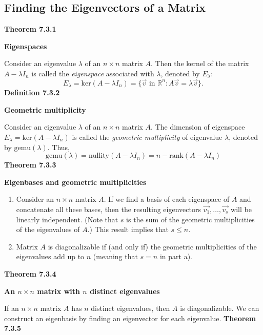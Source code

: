 \subsection{Finding the Eigenvectors of a Matrix}
\textbf{Theorem 7.3.1}\\
\par\noindent\textbf{Eigenspaces}
\par\noindent Consider an eigenvalue $\lambda{}$ of an $n\times{}n$ matrix $A$. Then the kernel of the matrix $A-\lambda{}I_{n}$ is called the \textit{eigenspace} associated with $\lambda{}$, denoted by $E_{\lambda{}}$:
\[E_\lambda{}=\textrm{ker}(A-\lambda{}I_{n})=\{\vec{v}\textrm{ in }\mathbb{R}^{n}:A\vec{v}=\lambda{}\vec{v}\}.\]
\textbf{Definition 7.3.2}\\
\par\noindent\textbf{Geometric multiplicity}
\par\noindent Consider an eigenvalue $\lambda{}$ of an $n\times{}n$ matrix $A$. The dimension of eigenspace $E_{\lambda{}}=\textrm{ker}(A-\lambda{}I_{n})$ is called the \textit{geometric multiplicity} of eigenvalue $\lambda{}$, denoted by $\textrm{gemu}(\lambda{})$. Thus,
\[\textrm{gemu}(\lambda{})=\textrm{nullity}(A-\lambda{}I_{n})=n-\textrm{rank}(A-\lambda{}I_{n})\]
\textbf{Theorem 7.3.3}\\
\par\noindent\textbf{Eigenbases and geometric multiplicities}
\renewcommand{\labelenumi}{\textbf{\alph{enumi}.}}
\begin{enumerate}
\item Consider an $n\times{}n$ matrix $A$. If we find a basis of each eigenspace of $A$ and concatenate all these bases, then the resulting eigenvectors $\vec{v_{1}},\ldots{},\vec{v_{s}}$ will be linearly independent. (Note that $s$ is the sum of the geometric multiplicities of the eigenvalues of $A$.) This result implies that $s\le{}n$.
\item Matrix $A$ is diagonalizable if (and only if) the geometric multiplicities of the eigenvalues add up to $n$ (meaning that $s=n$ in part a).
\end{enumerate}
\textbf{Theorem 7.3.4}\\
\par\noindent\textbf{An $n\times{}n$ matrix with $n$ distinct eigenvalues}
\par\noindent If an $n\times{}n$ matrix $A$ has $n$ distinct eigenvalues, then $A$ is diagonalizable. We can construct an eigenbasis by finding an eigenvector for each eigenvalue.
\textbf{Theorem 7.3.5}\\
